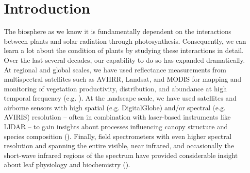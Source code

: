 \section{Introduction} \label{s:intro}
    The biosphere as we know it is fundamentally dependent on the interactions 
    between plants and solar radiation through photosynthesis. Consequently, we 
    can learn a lot about the condition of plants by studying these 
    interactions in detail. Over the last several decades, our capability to do 
    so has expanded dramatically. At regional and global scales, we have used
% 
% 
    reflectance measurements from multispectral satellites such as AVHRR, Landsat, and MODIS for mapping and monitoring of vegetation productivity,
    distribution, and abundance at high temporal frequency (e.g.
    \cite{Loveland2000, Friedl2002, Hansen2010, Houborg2015a}).  At the
    landscape scale, we have used satellites and airborne sensors with high
    spatial (e.g.  DigitalGlobe) and/or spectral (e.g.  AVIRIS) resolution --
    often in combination with laser-based instruments like LIDAR -- to gain
    insights about processes influencing canopy structure and species
    composition (\cite{Singh2015, Asner2015, Banskota2015}).  Finally, field
    spectrometers with even higher spectral resolution and spanning the entire
    visible, near infrared, and occasionally the short-wave infrared regions of
    the spectrum have provided considerable insight about leaf physiology and
    biochemistry (\cite{Serbin2012, Serbin2014, Couture2013, Zhao2014,
    Sullivan2013}).

